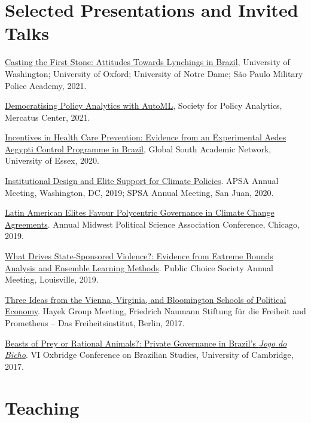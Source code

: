 \documentclass[a4paper]{article}
\renewenvironment{itemize}{
	\begin{list}{}{
			\setlength{\leftmargin}{1.5em}
		}
		}{
	\end{list}
}
\begin{document}
\section*{Selected Presentations and Invited Talks}

\begin{itemize}
\item \href{https://github.com/danilofreire/lynching-experiment-brazil}{Casting the First Stone: Attitudes Towards Lynchings in Brazil}, University of Washington; University of Oxford; University of Notre Dame; São Paulo Military Police Academy, 2021.
\item \href{http://github.com/danilofreire/mercatus-analytics-papers}{Democratising Policy Analytics with AutoML}, Society for Policy Analytics, Mercatus Center, 2021.
\item \href{https://danilofreire.github.io/essex2020/aedes.html}{Incentives in Health Care Prevention:
Evidence from an Experimental Aedes Aegypti Control Programme in Brazil}, Global South Academic Network, University of Essex, 2020.
\item \href{https://osf.io/9a6ch}{Institutional Design and Elite Support for Climate Policies}. APSA Annual Meeting, Washington, DC, 2019; SPSA Annual Meeting, San Juan, 2020.
\item \href{https://osf.io/9a6ch}{Latin American Elites Favour Polycentric Governance in Climate Change Agreements}. Annual Midwest Political Science Association Conference, Chicago, 2019.
\item \href{http://danilofreire.github.io/pcs-2019}{What Drives State-Sponsored Violence?: Evidence from Extreme Bounds Analysis and Ensemble Learning Methods}. Public Choice Society Annual Meeting, Louisville, 2019.
\item \href{https://www.overleaf.com/project/591ef5259fb58ede3dc4d369}{Three Ideas from the Vienna, Virginia, and Bloomington Schools of Political Economy}. Hayek Group Meeting, Friedrich Naumann Stiftung f{\"u}r die Freiheit and Prometheus -- Das Freiheitsinstitut, Berlin, 2017.
\item \href{https://osf.io/se2jr}{Beasts of Prey or Rational Animals?: Private Governance in Brazil's \emph{Jogo do Bicho}}. VI Oxbridge Conference on Brazilian Studies, University of Cambridge, 2017.
\end{itemize}

\section*{Teaching}
\end{document}
